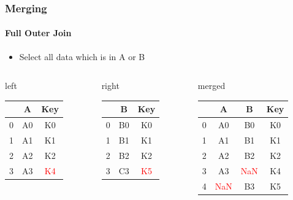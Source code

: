\documentclass[12pt,ngerman]{beamer}
\def\firstcircle{(0,0) circle (2cm)}
\def\secondcircle{(0:3cm) circle (2cm)}
\begin{document}
\begin{frame}
\frametitle{Merging}
\framesubtitle{Full Outer Join}

\begin{itemize}
\item Select all data which is in A or B
\end{itemize}

\begin{center}
\end{center}

{\footnotesize
\begin{columns}
\begin{column}{0.3\textwidth}
left \\
\begin{tabular}{c|cc} \toprule
   & A  &  Key \\ \midrule
0 & A0 &  K0 \\
1 & A1 &  K1 \\ 
2 & A2 &  K2 \\
3 & A3 &  \textcolor{red}{K4} \\ \bottomrule
\end{tabular}
\vspace*{1.2em}
\end{column}
\begin{column}{0.27\textwidth}
right \\
\begin{tabular}{c|cc} \toprule
   &  B   & Key \\ \midrule
0 &  B0 & K0 \\
1 &  B1 & K1 \\ 
2 &  B2 & K2 \\
3 &  C3 & \textcolor{red}{K5} \\ \bottomrule
\end{tabular}
\vspace*{1.2em}
\end{column}
\begin{column}{0.3\textwidth}
merged \\
\begin{tabular}{c|ccc} \toprule
   & A  & B   & Key \\ \midrule
0 & A0 & B0 & K0 \\
1 & A1 & B1 & K1 \\ 
2 & A2 & B2 & K2 \\ 
3 & A3 & \textcolor{red}{NaN} & K4 \\ 
4 & \textcolor{red}{NaN} & B3 & K5 \\ \bottomrule
\end{tabular} \\
\vspace*{0.2em}
\end{column}
\end{columns}}



\end{frame}
\end{document}
